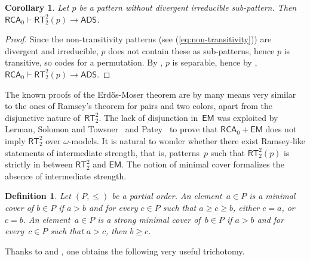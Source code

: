 \documentclass{article}
\numberwithin{theorem}{section}
\newtheorem{definition}[theorem]{Definition}
\newtheorem{corollary}[theorem]{Corollary}
\newcommand{\RCA}[0]{\mathsf{RCA}}
\newcommand{\ADS}[0]{\mathsf{ADS}}
\newcommand{\EM}[0]{\mathsf{EM}}
\newcommand{\RT}[0]{\mathsf{RT}}
\begin{document}
\begin{corollary}
Let $p$ be a pattern without divergent irreducible sub-pattern.
Then $\RCA_0 \vdash \RT^2_2(p) \to \ADS$.
\end{corollary}
\begin{proof}
Since the non-transitivity patterns (see (\ref{eq:non-transitivity})) are divergent and irreducible, $p$ does not contain these as sub-patterns, hence $p$ is transitive, so codes for a permutation.
By , $p$ is separable, hence by , $\RCA_0 \vdash \RT_2^2(p) \to \ADS$.
\end{proof}

The known proofs of the Erd\H{o}s-Moser theorem are by many means very similar to the ones of Ramsey's theorem for pairs and two colors, apart from the disjunctive nature of~$\RT^2_2$. The lack of disjunction in~$\EM$ was exploited by Lerman, Solomon and Towsner~\cite{lerman2013separating} and Patey~\cite{patey2017iterative} to prove that $\RCA_0 + \EM$ does not imply $\RT^2_2$ over $\omega$-models. It is natural to wonder whether there exist Ramsey-like statements of intermediate strength, that is, patterns~$p$ such that $\RT^2_2(p)$ is strictly in between $\RT^2_2$ and $\EM$. The notion of minimal cover formalizes the absence of intermediate strength.

\begin{definition}
Let $(P, \leq)$ be a partial order. An element~$a \in P$ is a \emph{minimal cover} of $b \in P$ if $a > b$ and for every $c \in P$ such that $a \geq c \geq b$, either $c = a$, or $c = b$. An element~$a \in P$ is a \emph{strong minimal cover} of~$b \in P$ if $a > b$ and for every~$c \in P$ such that $a > c$, then $b \geq c$.
\end{definition}

Thanks to  and , one obtains the following very useful trichotomy.
\end{document}
